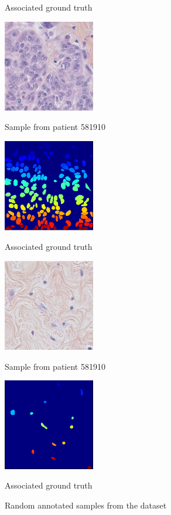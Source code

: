 \documentclass{article}
\begin{document}
\begin{figure}[htb]
\begin{minipage}[b]{0.48\linewidth}
  \centerline{Associated ground truth}\medskip
\end{minipage}
%
%
\begin{minipage}[b]{.48\linewidth}
  \centering
  \centerline{\includegraphics[width=4.0cm]{RGB_2}}
  \centerline{Sample from patient 581910}\medskip
\end{minipage}
\hfill
\begin{minipage}[b]{0.48\linewidth}
  \centering
  \centerline{\includegraphics[width=4.0cm]{GT_2}}
  \centerline{Associated ground truth}\medskip
\end{minipage}
%
%
\begin{minipage}[b]{.48\linewidth}
  \centering
  \centerline{\includegraphics[width=4.0cm]{RGB_3}}
  \centerline{Sample from patient 581910}\medskip
\end{minipage}
\hfill
\begin{minipage}[b]{0.48\linewidth}
  \centering
  \centerline{\includegraphics[width=4.0cm]{GT_3}}
  \centerline{Associated ground truth}\medskip
\end{minipage}
%
\caption{Random annotated samples from the dataset}
\label{fig:annotation}
%
\end{figure}
\end{document}
